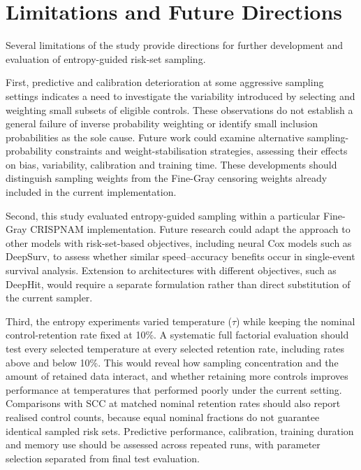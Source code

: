 \documentclass[a4paper,twoside,12pt]{report}
\begin{document}
\section{Limitations and Future Directions}

Several limitations of the study provide directions for further development and evaluation of entropy-guided risk-set sampling.

First, predictive and calibration deterioration at some aggressive sampling settings indicates a need to investigate the variability introduced by selecting and weighting small subsets of eligible controls. These observations do not establish a general failure of inverse probability weighting or identify small inclusion probabilities as the sole cause. Future work could examine alternative sampling-probability constraints and weight-stabilisation strategies, assessing their effects on bias, variability, calibration and training time. These developments should distinguish sampling weights from the Fine-Gray censoring weights already included in the current implementation.

Second, this study evaluated entropy-guided sampling within a particular Fine-Gray CRISPNAM implementation. Future research could adapt the approach to other models with risk-set-based objectives, including neural Cox models such as DeepSurv, to assess whether similar speed--accuracy benefits occur in single-event survival analysis. Extension to architectures with different objectives, such as DeepHit, would require a separate formulation rather than direct substitution of the current sampler.

Third, the entropy experiments varied temperature ($\tau$) while keeping the nominal control-retention rate fixed at 10\%. A systematic full factorial evaluation should test every selected temperature at every selected retention rate, including rates above and below 10\%. This would reveal how sampling concentration and the amount of retained data interact, and whether retaining more controls improves performance at temperatures that performed poorly under the current setting. Comparisons with SCC at matched nominal retention rates should also report realised control counts, because equal nominal fractions do not guarantee identical sampled risk sets. Predictive performance, calibration, training duration and memory use should be assessed across repeated runs, with parameter selection separated from final test evaluation.
\end{document}

